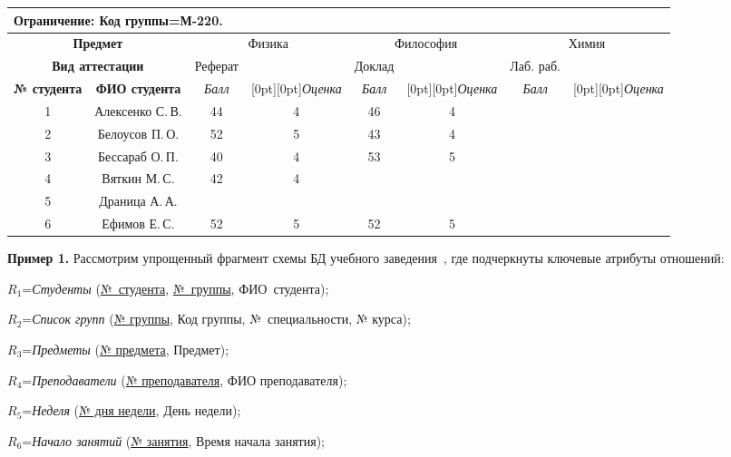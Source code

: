 \begin{multicols}{2}
\begin{table*}[b]
\begin{center}
  \begin{tabular}{|c|c|c|c|c|c|c|c|}
    \multicolumn{8}{l}{\textbf{Ограничение}: Код группы\;=\;М-220.}\\
    \hline
       \multicolumn{2}{|c|}{\textbf{Предмет}} &\multicolumn{2}{c|}{{Физика}} &
       \multicolumn{2}{c|}{{Философия} }
&\multicolumn{2}{c|}{{Химия}} \\
    \hline
    \multicolumn{2}{|c|}{\textbf{Вид аттестации}} & \multicolumn{1}{c|}{Реферат} & &
    \multicolumn{1}{c|}{Доклад} & &\multicolumn{1}{c|}{Лаб. раб.} &\\
    \cline{1-3}
    \cline{5-5}
    \cline{7-7}
    \textbf{№ студента} & \textbf{ФИО студента} & 
    \textit{Балл} & \multicolumn{1}{c|}{\raisebox{6pt}[0pt][0pt]{\textit{Оценка}}} & 
    \textit{Балл} & \multicolumn{1}{c|}{\raisebox{6pt}[0pt][0pt]{\textit{Оценка}}} & \textit{Балл} & 
    \multicolumn{1}{c|}{\raisebox{6pt}[0pt][0pt]{\textit{Оценка}}}\\
    \hline
1&Алексенко С.\,В.&44&4&46&4&&\\
2&Белоусов П.\,О.&52&5&43&4&&\\
3&Бессараб О.\,П.&40&4&53&5&&\\
4&Вяткин М.\,С.&42&4&&&&\\
5&Драница А.\,А.&&&&&&\\
6&Ефимов Е.\,С.&52&5&52&5&&\\
\hline
\end{tabular}
\end{center}
\end{table*}
  
  \medskip
  
  \noindent
  \textbf{Пример 1.} Рассмотрим упрощенный фрагмент схемы БД учебного 
заведения~\cite{8-z}, где подчеркнуты ключевые атрибуты отношений:

$R_1$\;=\;\textit{Студенты} (\underline{№~студента}, \underline{№~группы}, 
ФИО~студента);

$R_2$\;=\;\textit{Список групп} (\underline{№ группы}, Код группы, 
№~спе\-ци\-аль\-ности, № курса);

$R_3$\;=\;\textit{Предметы} (\underline{№ предмета}, Предмет);

$R_4$\;=\;\textit{Преподаватели} (\underline{№ преподавателя}, 
ФИО преподавателя);

$R_5$\;=\;\textit{Неделя} (\underline{№ дня недели}, День недели);

$R_6$\;=\;\textit{Начало занятий} (\underline{№ занятия}, 
Время начала занятия);


\end{multicols}
